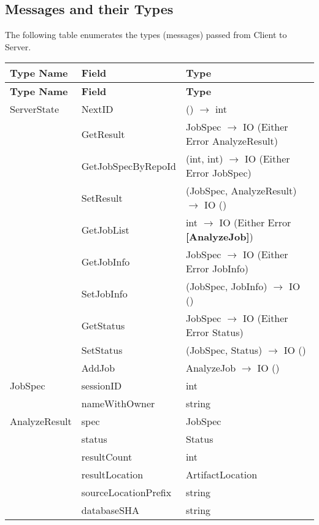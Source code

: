 \documentclass[11pt]{article}
\begin{document}
\subsection{Messages and their Types}
\label{sec:msg-types}
The following table enumerates the types (messages) passed from Client to Server.

\begin{longtable}{|p{5cm}|p{5cm}|p{5cm}|}
\hline
\rowcolor{gray!20} \textbf{Type Name} & \textbf{Field} & \textbf{Type} \\
\hline
\endfirsthead

\hline
\rowcolor{gray!20} \textbf{Type Name} & \textbf{Field} & \textbf{Type} \\
\hline
\endhead

\hline
\endfoot

\hline
\endlastfoot

ServerState & NextID & () $\rightarrow$ int \\
& GetResult & JobSpec $\rightarrow$ IO (Either Error AnalyzeResult) \\
& GetJobSpecByRepoId & (int, int) $\rightarrow$ IO (Either Error JobSpec) \\
& SetResult & (JobSpec, AnalyzeResult) $\rightarrow$ IO () \\
& GetJobList & int $\rightarrow$ IO (Either Error \textbf{[AnalyzeJob]}) \\
& GetJobInfo & JobSpec $\rightarrow$ IO (Either Error JobInfo) \\
& SetJobInfo & (JobSpec, JobInfo) $\rightarrow$ IO () \\
& GetStatus & JobSpec $\rightarrow$ IO (Either Error Status) \\
& SetStatus & (JobSpec, Status) $\rightarrow$ IO () \\
& AddJob & AnalyzeJob $\rightarrow$ IO () \\

\hline
JobSpec & sessionID & int \\
& nameWithOwner & string \\

\hline
AnalyzeResult & spec & JobSpec \\
& status & Status \\
& resultCount & int \\
& resultLocation & ArtifactLocation \\
& sourceLocationPrefix & string \\
& databaseSHA & string \\


\end{longtable}
\end{document}
